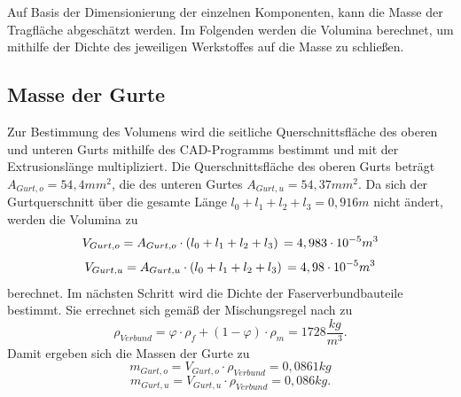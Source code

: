 Auf Basis der Dimensionierung der einzelnen Komponenten, kann die Masse der Tragfläche abgeschätzt werden. Im Folgenden werden die Volumina berechnet, um mithilfe der Dichte des jeweiligen Werkstoffes auf die Masse zu schließen.
\subsection{Masse der Gurte}
Zur Bestimmung des Volumens wird die seitliche Querschnittsfläche des oberen und unteren Gurts mithilfe des CAD-Programms bestimmt und mit der Extrusionslänge multipliziert. Die Querschnittsfläche des oberen Gurts beträgt $A_{Gurt,o}=54,4mm^{2}$, die des unteren Gurtes $ A_{Gurt,u}=54,37mm^{2} $. Da sich der Gurtquerschnitt über die gesamte Länge $l_{0}+l_{1}+l_{2}+l_{3}=0,916m$ nicht ändert, werden die Volumina zu 
\begin{equation}
	V_{Gurt,o}=A_{Gurt,o}\cdot \left(l_{0}+l_{1}+l_{2}+l_{3}\right)\\
	=4,983\cdot 10^{-5}m^{3}
\end{equation}
\begin{equation}
	V_{Gurt,u}=A_{Gurt,u}\cdot \left(l_{0}+l_{1}+l_{2}+l_{3}\right)\\
	=4,98\cdot 10^{-5}m^{3}
\end{equation}
berechnet. Im nächsten Schritt wird die Dichte der Faserverbundbauteile bestimmt. Sie errechnet sich gemäß der Mischungsregel nach \cite{item3} zu
\begin{equation}
	\rho_{Verbund}=\varphi\cdot\rho_{f}+\left(1-\varphi\right)\cdot\rho_{m}
	=1728\frac{kg}{m^{3}}.
\end{equation}
Damit ergeben sich die Massen der Gurte zu
\begin{equation}
	m_{Gurt,o}=V_{Gurt,o}\cdot\rho_{Verbund}=0,0861kg
\end{equation}
\begin{equation}
		m_{Gurt,u}=V_{Gurt,u}\cdot\rho_{Verbund}=0,086kg .
\end{equation}

